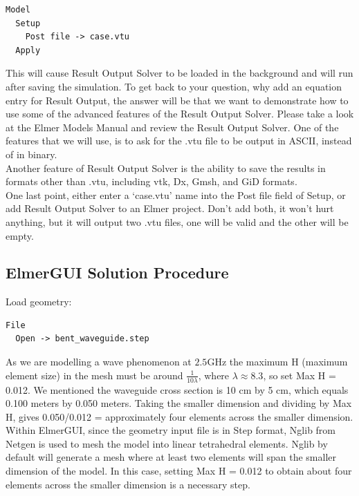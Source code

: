 \begin{verbatim}
Model
  Setup
    Post file -> case.vtu
  Apply
\end{verbatim}

This will cause Result Output Solver to be loaded in the background and will run after saving the simulation.  To get back to your question, why add an equation entry for Result Output, the answer will be that we want to demonstrate how to use some of the advanced features of the Result Output Solver.  Please take a look at the Elmer Models Manual and review the Result Output Solver.  One of the features that we will use, is to ask for the .vtu file to be output in ASCII, instead of in binary.\\

Another feature of Result Output Solver is the ability to save the results in formats other than .vtu, including vtk, Dx, Gmsh, and GiD formats.\\

One last point, either enter a `case.vtu' name into the Post file field of Setup, or add Result Output Solver to an Elmer project.  Don't add both, it won't hurt anything, but it will output two .vtu files, one will be valid and the other will be empty.\\

\subsection*{ElmerGUI Solution Procedure}

Load geometry:
\begin{verbatim}
File
  Open -> bent_waveguide.step
\end{verbatim}

As we are modelling a wave phenomenon at $2.5 \mathrm{GHz}$ the maximum H (maximum element size) in the mesh must be around $\frac 1 {10\lambda}$, where $\lambda\approx8.3$, so set Max H = 0.012.  We mentioned the waveguide cross section is 10 cm by 5 cm, which equals 0.100 meters by 0.050 meters.  Taking the smaller dimension and dividing by Max H, gives 0.050/0.012 = approximately four elements across the smaller dimension.\\

Within ElmerGUI, since the geometry input file is in Step format, Nglib from Netgen is used to mesh the model into linear tetrahedral elements.  Nglib by default will generate a mesh where at least two elements will span the smaller dimension of the model.  In this case, setting Max H = 0.012 to obtain about four elements across the smaller dimension is a necessary step.\\

